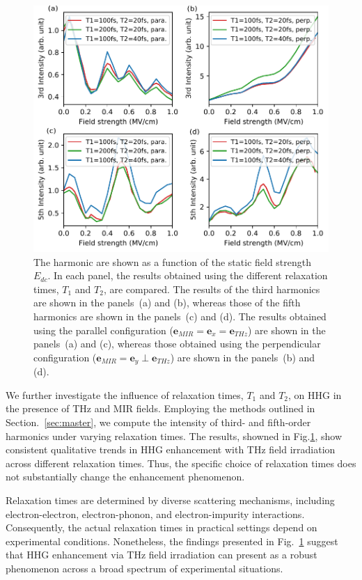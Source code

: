 \begin{figure}[tb]
	\includegraphics[width=0.9\linewidth]{pic/SI_t1t2.pdf}
	\caption{\label{fig:intensity_relaxation}
		The harmonic are shown as a function of the static field strength $E_{dc}$. In each panel, the results obtained using the different relaxation times, $T_1$ and $T_2$, are compared. The results of the third harmonics are shown in the panels~(a) and (b), whereas those of the fifth harmonics are shown in the panels~(c) and (d). The results obtained using the parallel configuration ($\mathbf e_{MIR}=\mathbf e_x = \mathbf e_{THz}$) are shown in the panels~(a) and (c), whereas those obtained using the perpendicular configuration ($\mathbf e_{MIR}=\mathbf e_y \perp \mathbf e_{THz}$) are shown in the panels~(b) and (d).
	}
\end{figure}

We further investigate the influence of relaxation times, $T_1$ and $T_2$, on HHG in the presence
of THz and MIR fields. Employing the methods outlined in Section.~\ref{sec:master}, we compute the intensity of third- and fifth-order harmonics under varying relaxation times. The results, showned in Fig.\ref{fig:intensity_relaxation}, show consistent qualitative trends in HHG enhancement with THz field irradiation across different relaxation times. Thus, the specific choice of relaxation times does not substantially change the enhancement phenomenon.

Relaxation times are determined by diverse scattering mechanisms, including electron-electron,
electron-phonon, and electron-impurity interactions. Consequently, the actual relaxation times in
practical settings depend on experimental conditions. Nonetheless, the findings presented in
Fig.~\ref{fig:intensity_relaxation} suggest that HHG enhancement via THz field irradiation can
present as a robust phenomenon across a broad spectrum of experimental situations.

